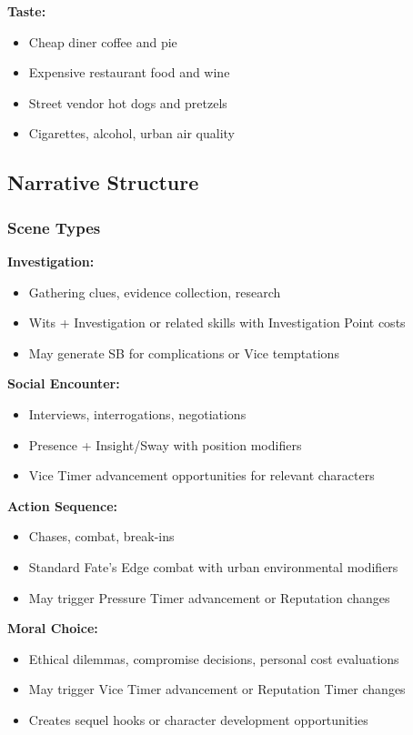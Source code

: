 \documentclass[11pt]{article}
\begin{document}
\textbf{Taste:}
\begin{itemize}
\item Cheap diner coffee and pie
\item Expensive restaurant food and wine
\item Street vendor hot dogs and pretzels
\item Cigarettes, alcohol, urban air quality
\end{itemize}

\subsection{Narrative Structure}

\subsubsection{Scene Types}

\textbf{Investigation:}
\begin{itemize}
\item Gathering clues, evidence collection, research
\item Wits + Investigation or related skills with Investigation Point costs
\item May generate SB for complications or Vice temptations
\end{itemize}

\textbf{Social Encounter:}
\begin{itemize}
\item Interviews, interrogations, negotiations
\item Presence + Insight/Sway with position modifiers
\item Vice Timer advancement opportunities for relevant characters
\end{itemize}

\textbf{Action Sequence:}
\begin{itemize}
\item Chases, combat, break-ins
\item Standard Fate's Edge combat with urban environmental modifiers
\item May trigger Pressure Timer advancement or Reputation changes
\end{itemize}

\textbf{Moral Choice:}
\begin{itemize}
\item Ethical dilemmas, compromise decisions, personal cost evaluations
\item May trigger Vice Timer advancement or Reputation Timer changes
\item Creates sequel hooks or character development opportunities
\end{itemize}
\end{document}
